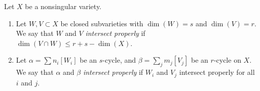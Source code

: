 \begin{definition}
\label{definition-proper-intersection}
Let $X$ be a nonsingular variety.
\begin{enumerate}
\item Let $W,V \subset X$ be closed subvarieties with
$\dim(W) = s$ and $\dim(V) = r$. We say that $W$ and $V$
{\it intersect properly} if $\dim(V \cap W) \leq r + s - \dim(X)$.
\item Let $\alpha = \sum n_i [W_i]$ be an $s$-cycle,
and $\beta = \sum_j m_j [V_j]$ be an $r$-cycle on $X$. We say
that $\alpha$ and $\beta$ {\it intersect properly} if
$W_i$ and $V_j$ intersect properly for all $i$ and $j$.
\end{enumerate}
\end{definition}